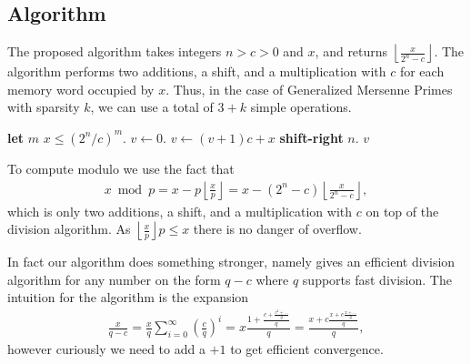 
\subsection{Algorithm}

The proposed algorithm takes integers $n>c>0$ and $x$, and returns
$\left\lfloor\frac{x}{2^n-c}\right\rfloor$.
The algorithm performs two additions, a shift, and a multiplication with $c$ for each memory word occupied by $x$.
Thus, in the case of Generalized Mersenne Primes with sparsity $k$, we can use a total of $3+k$ simple operations.
\begin{algorithm}
   \begin{algorithmic}[1]
         \State \textbf{let} $m$  $x \le (2^n/c)^m$.
         \State $v \gets 0$.
            \State $v \gets (v + 1)c+x$ \textbf{shift-right} $n$.
         \EndFor
         \State \Return $v$
      \EndProcedure
   \end{algorithmic}
\end{algorithm}




To compute modulo we use the fact that
\begin{align}
   x \bmod p
   = x - p\left\lfloor\frac{x}{p}\right\rfloor
   = x - (2^n - c)\left\lfloor\frac{x}{2^n-c}\right\rfloor,
\end{align}
which is only two additions, a shift, and a multiplication with $c$ on top of the division algorithm.
As $\left\lfloor\frac{x}{p}\right\rfloor p \le x$ there is no danger of overflow.

In fact our algorithm does something stronger, namely gives an efficient division algorithm for any number on the form $q-c$ where $q$ supports fast division.
The intuition for the algorithm is the expansion
\begin{align}
   \frac{x}{q-c}
   = \frac{x}{q}\sum_{i=0}^\infty \left(\frac{c}{q}\right)^i
   = x\frac{1+\frac{c+\frac{c^2 + \dots}{q}}{q}}{q}
   = \frac{x+c\frac{x+c\frac{x + \dots}{q}}{q}}{q},
\end{align}
however curiously we need to add a $+1$ to get efficient convergence.

